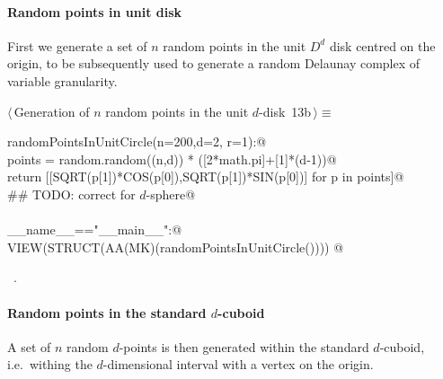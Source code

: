 \documentclass[11pt,oneside]{article}	%
\begin{document}
\paragraph{Random points in unit disk} 
First we generate a  set of $n$ random points in the unit $D^d$ disk centred on the origin, to be subsequently used to generate a random Delaunay complex of variable granularity.

\begin{flushleft} \small \label{scrap23}
\protect{}$\langle\,$Generation of $n$ random points in the unit $d$-disk\nobreak\ {\footnotesize 13b}$\,\rangle\equiv$
\vspace{-1ex}
\begin{list}{}{} \item
\mbox{}\verb@def randomPointsInUnitCircle(n=200,d=2, r=1):@\\
\mbox{}\verb@   points = random.random((n,d)) * ([2*math.pi]+[1]*(d-1))@\\
\mbox{}\verb@   return [[SQRT(p[1])*COS(p[0]),SQRT(p[1])*SIN(p[0])] for p in points]@\\
\mbox{}\verb@   ## TODO: correct for $d$-sphere@\\
\mbox{}\verb@@\\
\mbox{}\verb@if __name__=="__main__":@\\
\mbox{}\verb@   VIEW(STRUCT(AA(MK)(randomPointsInUnitCircle()))) @\\
\mbox{}\verb@@{\NWsep}
\end{list}
\vspace{-1ex}
\footnotesize\addtolength{\baselineskip}{-1ex}
\begin{list}{}{\setlength{\itemsep}{-\parsep}\setlength{\itemindent}{-\leftmargin}}
\item \NWtxtMacroRefIn\ .
\end{list}
\end{flushleft}

\paragraph{Random points in the standard $d$-cuboid} 
A set of $n$ random $d$-points is then generated within the standard $d$-cuboid, i.e.~withing the $d$-dimensional interval with a vertex on the origin.
\end{document}
